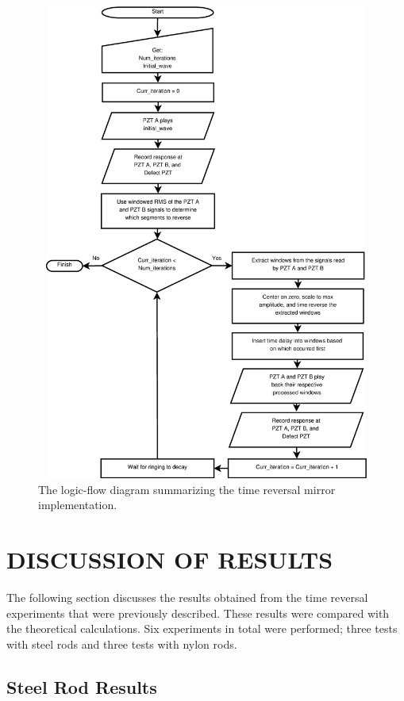 \documentclass[11pt,letterpaper]{article}%
\begin{document}
\begin{figure}
\begin{center}
\includegraphics[width=15.7cm,height=15.75cm]{newFlow.eps}
\end{center}
 \caption[flo1]
   { \label{flow}
The logic-flow diagram summarizing the time reversal mirror
implementation.}
\end{figure}


\section{DISCUSSION OF RESULTS}
\label{sect:res}

The following section discusses the results obtained from the time reversal experiments that were previously described. These results were compared with the theoretical calculations. Six experiments in total were performed; three tests with steel rods and three tests with nylon rods.

\subsection{Steel Rod Results}
\label{sect:steelRodResults}
\end{document}
